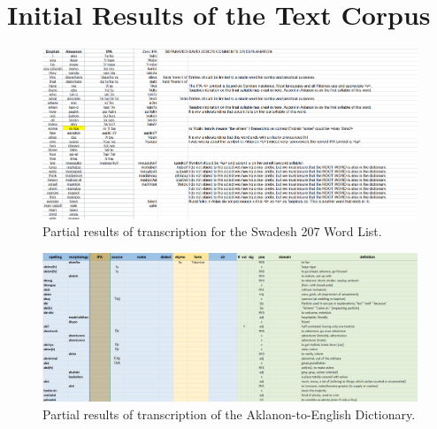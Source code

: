 %
%
%                 

\chapter{Initial Results of the Text Corpus}
\label{sec:appendixc}


\begin{figure}[h!]
    \centering
    \includegraphics[width=\textwidth]{./appendix/prelim_transcription.png}
    \caption{Partial results of transcription for the Swadesh 207 Word List.}
    \label{fig:transcription1}
\end{figure}

\begin{figure}[h!]
    \centering
    \includegraphics[width=\textwidth]{./appendix/dictionary.png}
    \caption{Partial results of transcription of the Aklanon-to-English Dictionary.}
    \label{fig:trans}
\end{figure}

